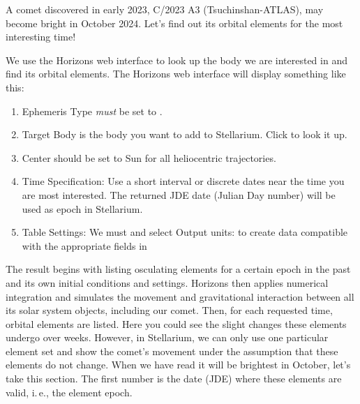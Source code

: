 A comet discovered in early 2023, C/2023 A3 (Tsuchinshan-ATLAS), may become bright in October 2024. 
Let's find out its orbital elements for the most interesting time! 

We use the Horizons web interface to look up the body we are interested in and find its orbital elements. 
The Horizons web interface will display something like this:\vspace{\baselineskip}

\vspace{\baselineskip}

\begin{enumerate}
\item Ephemeris Type \emph{must} be set to .
\item Target Body is the body you want to add to Stellarium. Click  to look it up.
\item Center should be set to  Sun for all heliocentric trajectories.
\item Time Specification: Use a short interval or discrete dates near the time you are most interested. The returned JDE date (Julian Day number) will be used as epoch in Stellarium.
\item Table Settings: We must  and select Output units:  to create data compatible with the appropriate fields in 
\end{enumerate}

\noindent The result begins with listing osculating elements for a certain epoch in the past and its own initial conditions and settings. 
Horizons then applies numerical integration and simulates the movement and gravitational interaction between all its solar system objects, including our comet. 
Then, for each requested time, orbital elements are listed. Here you could see the slight changes these elements undergo over weeks. 
However, in Stellarium, we can only use one particular element set and show the comet's movement under the assumption that these elements do not change. 
When we have read it will be brightest in October, let's take this section. The first number is the date (JDE) where these elements are valid, 
i.\,e., the element epoch.

